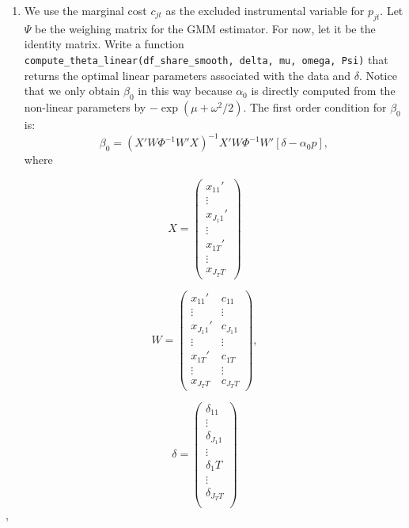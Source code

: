 \documentclass[
]{book}
\providecommand{\tightlist}{%
  \setlength{\itemsep}{0pt}\setlength{\parskip}{0pt}}
\begin{document}
\begin{enumerate}
\def\labelenumi{\arabic{enumi}.}
\setcounter{enumi}{9}
\tightlist
\item
  We use the marginal cost \(c_{jt}\) as the excluded instrumental variable for \(p_{jt}\). Let \(\Psi\) be the weighing matrix for the GMM estimator. For now, let it be the identity matrix. Write a function \texttt{compute\_theta\_linear(df\_share\_smooth,\ delta,\ mu,\ omega,\ Psi)} that returns the optimal linear parameters associated with the data and \(\delta\). Notice that we only obtain \(\beta_0\) in this way because \(\alpha_0\) is directly computed from the non-linear parameters by \(-\exp(\mu + \omega^2/2)\). The first order condition for \(\beta_0\) is:
  \begin{equation}
  \beta_0 = (X'W \Phi^{-1} W'X)^{-1} X' W \Phi^{-1} W' [\delta - \alpha_0 p],
  \end{equation}
  where
\end{enumerate}

\begin{equation}
X = 
\begin{pmatrix}
x_{11}'\\
\vdots \\
x_{J_1 1}'\\
\vdots \\
x_{1T}' \\
\vdots \\
x_{J_T T} 
\end{pmatrix}
\end{equation}

\begin{equation}
W = 
\begin{pmatrix}
x_{11}' & c_{11}\\
\vdots & \vdots \\
x_{J_1 1}' & c_{J_1 1}\\
\vdots & \vdots \\
x_{1T}' & c_{1T}\\
\vdots & \vdots \\
x_{J_T T} & c_{J_T T}
\end{pmatrix},
\end{equation}

\begin{equation}
\delta =
\begin{pmatrix}
\delta_11\\
\vdots\\
\delta_{J_1 1}\\
\vdots\\
\delta_1T\\
\vdots\\
\delta_{J_T T}\\
\end{pmatrix}
\end{equation},
\end{document}
